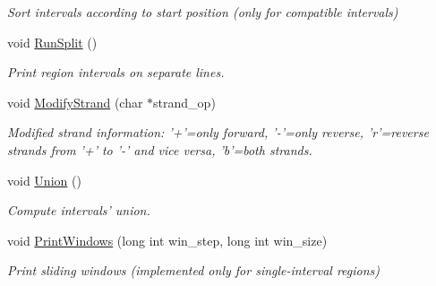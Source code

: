 \begin{DoxyCompactItemize}
\begin{DoxyCompactList}\small\item\em Sort intervals according to start position (only for compatible intervals) \end{DoxyCompactList}\item 
\hypertarget{classGenomicRegionSAM_ae195a95ba837bfd9673093f1d451b39c}{
void \hyperlink{classGenomicRegionSAM_ae195a95ba837bfd9673093f1d451b39c}{RunSplit} ()}
\label{classGenomicRegionSAM_ae195a95ba837bfd9673093f1d451b39c}

\begin{DoxyCompactList}\small\item\em Print region intervals on separate lines. \end{DoxyCompactList}\item 
\hypertarget{classGenomicRegionSAM_abeb76df49bb89ecf0f3074805d9fe7b2}{
void \hyperlink{classGenomicRegionSAM_abeb76df49bb89ecf0f3074805d9fe7b2}{ModifyStrand} (char $\ast$strand\_\-op)}
\label{classGenomicRegionSAM_abeb76df49bb89ecf0f3074805d9fe7b2}

\begin{DoxyCompactList}\small\item\em Modified strand information: '+'=only forward, '-\/'=only reverse, 'r'=reverse strands from '+' to '-\/' and vice versa, 'b'=both strands. \end{DoxyCompactList}\item 
\hypertarget{classGenomicRegionSAM_a6161ba10d2a4871cc43aa5bc597a787b}{
void \hyperlink{classGenomicRegionSAM_a6161ba10d2a4871cc43aa5bc597a787b}{Union} ()}
\label{classGenomicRegionSAM_a6161ba10d2a4871cc43aa5bc597a787b}

\begin{DoxyCompactList}\small\item\em Compute intervals' union. \end{DoxyCompactList}\item 
\hypertarget{classGenomicRegionSAM_a27027bc80a3b5a864ebafd415a6ef5a6}{
void \hyperlink{classGenomicRegionSAM_a27027bc80a3b5a864ebafd415a6ef5a6}{PrintWindows} (long int win\_\-step, long int win\_\-size)}
\label{classGenomicRegionSAM_a27027bc80a3b5a864ebafd415a6ef5a6}

\begin{DoxyCompactList}\small\item\em Print sliding windows (implemented only for single-\/interval regions) \end{DoxyCompactList}\end{DoxyCompactItemize}
